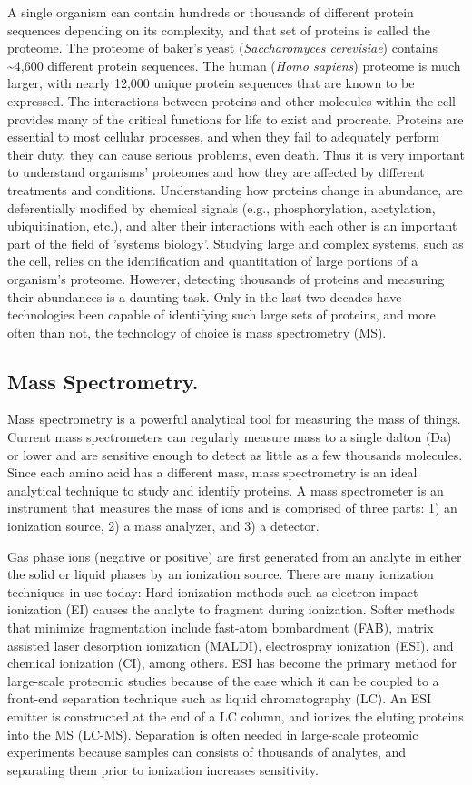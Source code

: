 A single organism can contain hundreds or thousands of different protein sequences depending on its complexity, and that set of proteins is called the proteome. The proteome of baker's yeast (\emph{Saccharomyces cerevisiae}) contains \textasciitilde4,600 different protein sequences. The human (\emph{Homo sapiens}) proteome is much larger, with nearly 12,000 unique protein sequences that are known to be expressed. The interactions between proteins and other molecules within the cell provides many of the critical functions for life to exist and procreate. Proteins are essential to most cellular processes, and when they fail to adequately perform their duty, they can cause serious problems, even death. Thus it is very important to understand organisms' proteomes and how they are affected by different treatments and conditions. Understanding how proteins change in abundance, are deferentially modified by chemical signals (e.g., phosphorylation, acetylation, ubiquitination, etc.), and alter their interactions with each other is an important part of the field of 'systems biology'. Studying large and complex systems, such as the cell, relies on the identification and quantitation of large portions of a organism's proteome. However, detecting thousands of proteins and measuring their abundances is a daunting task. Only in the last two decades have technologies been capable of identifying such large sets of proteins, and more often than not, the technology of choice is mass spectrometry (MS). 

\subsection*{Mass Spectrometry.}
Mass spectrometry is a powerful analytical tool for measuring the mass of things. Current mass spectrometers can regularly measure mass to a single dalton (Da) or lower and are sensitive enough to detect as little as a few thousands molecules. Since each amino acid has a different mass, mass spectrometry is an ideal analytical technique to study and identify proteins. A mass spectrometer is an instrument that measures the mass of ions and is comprised of three parts: 1) an ionization source, 2) a mass analyzer, and 3) a detector. 

Gas phase ions (negative or positive) are first generated from an analyte in either the solid or liquid phases by an ionization source. There are many ionization techniques in use today: Hard-ionization methods such as electron impact ionization (EI) causes the analyte to fragment during ionization. Softer methods that minimize fragmentation include fast-atom bombardment (FAB)\cite{fab}, matrix assisted laser desorption ionization (MALDI)\cite{maldi,maldi2}, electrospray ionization (ESI)\cite{esi}, and chemical ionization (CI)\cite{ci}, among others. ESI has become the primary method for large-scale proteomic studies because of the ease which it can be coupled to a front-end separation technique such as liquid chromatography (LC). An ESI emitter is constructed at the end of a LC column, and ionizes the eluting proteins into the MS (LC-MS). Separation is often needed in large-scale proteomic experiments because samples can consists of thousands of analytes, and separating them prior to ionization increases sensitivity. 

